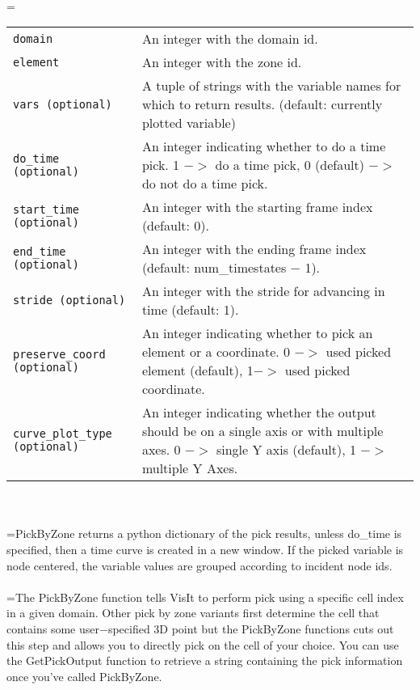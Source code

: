 \documentclass[10pt,a4paper]{report}
\begin{document}
 \\ 
\hangindent=\parindent 
\begin{tabular}{lp{9cm}}
\verb!domain! & An integer with the domain id. \\
\verb!element! & An integer with the zone id. \\
\verb!vars (optional)! & A tuple of strings with the variable names for which to return results. (default: currently plotted variable) \\
\verb!do_time (optional)! & An integer indicating whether to do a time pick. 1 $-$$>$ do a time pick, 0 (default) $-$$>$ do not do a time pick. \\
\verb!start_time (optional)! & An integer with the starting frame index (default: 0). \\
\verb!end_time (optional)! & An integer with the ending frame index (default: num\_timestates $-$ 1). \\
\verb!stride (optional)! & An integer with the stride for advancing in time (default: 1). \\
\verb!preserve_coord (optional)! & An integer indicating whether to pick an element or a coordinate. 0 $-$$>$ used picked element (default), 1$-$$>$ used picked coordinate. \\
\verb!curve_plot_type (optional)! & An integer indicating whether the output should be on a single axis or with multiple axes. 0 $-$$>$ single Y axis (default), 1 $-$$>$ multiple Y Axes. \\
\end{tabular} \\[-2mm]


 \\ 
\hangindent=\parindent PickByZone returns a python dictionary of the pick results, unless do\_time is specified, then a time curve is created in a new window. If the picked variable is node centered, the variable values are grouped according to incident node ids. \\[-3mm] 

 \\ 
\hangindent=\parindent The PickByZone function tells VisIt to perform pick using a specific cell index in a given domain. Other pick by zone variants first determine the cell that contains some user$-$specified 3D point but the PickByZone functions cuts out this step and allows you to directly pick on the cell of your choice. You can use the GetPickOutput function to retrieve a string containing the pick information once you've called PickByZone. \\[-3mm] 
\end{document}
